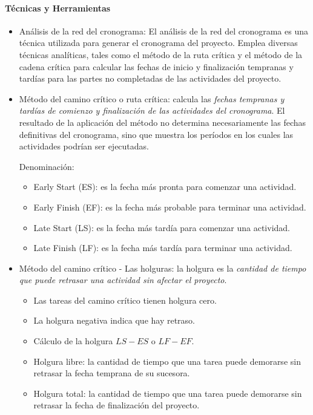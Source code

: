 \documentclass[a4paper,twosides]{article}
\newlength{\wideitemsep}
\let\olditem\item
\renewcommand{\item}{\setlength{\itemsep}{\wideitemsep}\olditem}
\begin{document}
\paragraph{Técnicas y Herramientas}
\begin{itemize}
\item Análisis de la red del cronograma: El análisis de la red del cronograma es una técnica utilizada para generar el cronograma del proyecto. Emplea diversas técnicas analíticas, tales como el método de la ruta crítica y el método de la cadena crítica para calcular las fechas de inicio y finalización tempranas y tardías para las partes no completadas de las actividades del proyecto.
\item Método del camino crítico o ruta crítica: calcula las \emph{fechas tempranas y tardías de comienzo y finalización de las actividades del cronograma}. El resultado de la aplicación del método no determina necesariamente las fechas definitivas del cronograma, sino que muestra los períodos en los cuales las actividades podrían ser ejecutadas.
\par Denominación:
\begin{itemize}
\item Early Start (ES): es la fecha más pronta para comenzar una actividad.
\item Early Finish (EF): es la fecha más probable para terminar una actividad.
\item Late Start (LS): es la fecha más tardía para comenzar una actividad.
\item Late Finish (LF): es la fecha más tardía para terminar una actividad.
\end{itemize}
\item Método del camino crítico - Las holguras: la holgura es la \emph{cantidad de tiempo que puede retrasar una actividad sin afectar el proyecto}.
\begin{itemize}
\item Las tareas del camino crítico tienen holgura cero.
\item La holgura negativa indica que hay retraso.
\item Cálculo de la holgura $LS-ES$ o $LF-EF$.
\item Holgura libre: la cantidad de tiempo que una tarea puede demorarse sin retrasar la fecha temprana de su sucesora.
\item Holgura total: la cantidad de tiempo que una tarea puede demorarse sin retrasar la fecha de finalización del proyecto.
\end{itemize}

\end{itemize}
\end{document}
